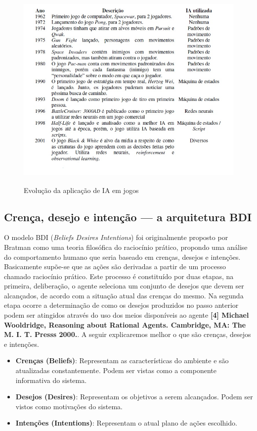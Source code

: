 \begin{figure}
\centering
\includegraphics [height=10cm]{figuras/evolucao_IA_jogos.jpg}
\caption{Evolução da aplicação de IA em jogos}
\label{IA em jogos}
\end{figure}


\subsection{Crença, desejo e intenção --- a arquitetura BDI}

O modelo BDI (\textit{Beliefs Desires Intentions}) foi originalmente proposto por Bratman como uma teoria filosófica do raciocínio prático, propondo uma análise do comportamento humano que seria baseado em crenças, desejos e intenções.
Basicamente supõe-se que as ações são derivadas a partir de um processo chamado raciocínio prático. Este processo é constituído por duas etapas, na primeira, deliberação, o agente seleciona um conjunto de desejos que devem ser alcançados, de acordo com a situação atual das crenças do mesmo. Na segunda etapa ocorre a determinação de como os desejos produzidos no passo anterior podem ser atingidos através do uso dos meios disponíveis ao agente \textbf{[4] Michael Wooldridge, Reasoning about Rational Agents. Cambridge, MA: The M. I. T. Presss 2000.}.
A seguir explicaremos melhor o que são crenças, desejos e intenções.
\begin{itemize}
\item \textbf{Crenças (Beliefs)}: Representam as características do ambiente e são atualizadas constantemente. Podem ser vistas como a componente informativa do sistema.
\item \textbf{Desejos (Desires)}: Representam os objetivos a serem alcançados. Podem ser vistos como motivações do sistema.
\item \textbf{Intenções (Intentions)}: Representam o atual plano de ações escolhido. 
\end{itemize}

